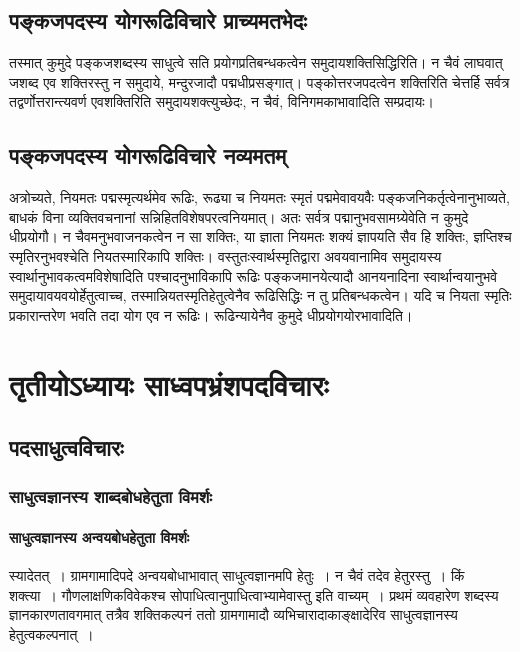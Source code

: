 	\section{पङ्कजपदस्य योगरूढिविचारे प्राच्यमतभेदः}

		तस्मात् कुमुदे पङ्कजशब्दस्य साधुत्वे सति प्रयोगप्रतिबन्धकत्वेन  समुदायशक्तिसिद्धिरिति।  न चैवं लाघवात् जशब्द एव शक्तिरस्तु न समुदाये, मन्दुरजादौ पद्मधीप्रसङ्गात्। पङ्कोत्तरजपदत्वेन शक्तिरिति चेत्तर्हि सर्वत्र तद्वर्णोत्तरान्त्यवर्ण एवशक्तिरिति समुदायशक्त्युच्छेदः, न चैवं, विनिगमकाभावादिति सम्प्रदायः।

	\section{पङ्कजपदस्य योगरूढिविचारे नव्यमतम्}

		अत्रोच्यते, नियमतः पद्मस्मृत्यर्थमेव रूढिः, रूढ्या च नियमतः स्मृतं पद्ममेवावयवैः पङ्कजनिकर्तृत्वेनानुभाव्यते, बाधकं विना व्यक्तिवचनानां सन्निहितविशेषपरत्वनियमात्। अतः सर्वत्र पद्मानुभवसामग्र्येवेति न कुमुदे धीप्रयोगौ। न चैवमनुभवाजनकत्वेन न सा शक्तिः, या ज्ञाता नियमतः शक्यं ज्ञापयति सैव हि शक्तिः,  ज्ञप्तिश्च स्मृतिरनुभवश्चेति नियतस्मारिकापि शक्तिः। वस्तुतःस्वार्थस्मृतिद्वारा अवयवानामिव समुदायस्य स्वार्थानुभावकत्वमविशेषादिति पश्चादनुभाविकापि रूढिः पङ्कजमानयेत्यादौ आनयनादिना स्वार्थान्वयानुभवे  समुदायावयवयोर्हेतुत्वाच्च,  तस्मान्नियतस्मृतिहेतुत्वेनैव रूढिसिद्धिः न तु प्रतिबन्धकत्वेन। यदि च नियता स्मृतिः प्रकारान्तरेण भवति तदा योग एव न रूढिः। रूढिन्यायेनैव कुमुदे धीप्रयोगयोरभावादिति।  
			
\chapter{तृतीयोऽध्यायः साध्वपभ्रंशपदविचारः}

	\section{पदसाधुत्वविचारः}
	
		\subsection{साधुत्वज्ञानस्य शाब्दबोधहेतुता विमर्शः}
	
			\subsubsection{साधुत्वज्ञानस्य अन्वयबोधहेतुता विमर्शः}
			
				\begin{small}
					
					स्यादेतत्~। ग्रामगामादिपदे अन्वयबोधाभावात् साधुत्वज्ञानमपि हेतुः~। न चैवं तदेव हेतुरस्तु~। किं शक्त्या~। गौणलाक्षणिकविवेकश्च सोपाधित्वानुपाधित्वाभ्यामेवास्तु इति वाच्यम्~। प्रथमं व्यवहारेण शब्दस्य ज्ञानकारणतावगमात् तत्रैव शक्तिकल्पनं ततो ग्रामगामादौ व्यभिचारादाकाङ्क्षादेरिव साधुत्वज्ञानस्य हेतुत्वकल्पनात्~। 
				\end{small}
			
